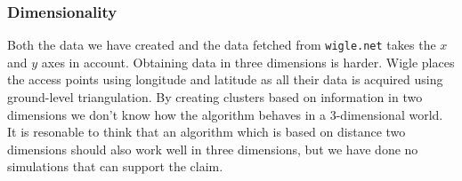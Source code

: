 \subsubsection{Dimensionality} 
Both the data we have created and the data fetched from \verb|wigle.net| takes the $x$ and $y$ axes in account. Obtaining data in three dimensions is harder.
Wigle places the access points using longitude and latitude as all their data is acquired using ground-level triangulation.
By creating clusters based on information in two dimensions we don't know how the algorithm behaves in a 3-dimensional world. It is resonable to think that an algorithm
which is based on distance two dimensions should also work well in three dimensions, but we have done no simulations that can support the claim. 




